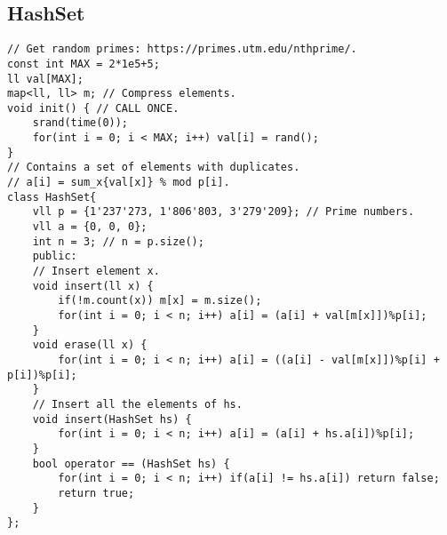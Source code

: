 \documentclass[a4paper]{article}
\begin{document}
\subsection*{HashSet}
\begin{verbatim}
// Get random primes: https://primes.utm.edu/nthprime/.
const int MAX = 2*1e5+5;
ll val[MAX];
map<ll, ll> m; // Compress elements.
void init() { // CALL ONCE.
    srand(time(0));
    for(int i = 0; i < MAX; i++) val[i] = rand();
}
// Contains a set of elements with duplicates.
// a[i] = sum_x{val[x]} % mod p[i].
class HashSet{
    vll p = {1'237'273, 1'806'803, 3'279'209}; // Prime numbers.
    vll a = {0, 0, 0};
    int n = 3; // n = p.size();
    public:
    // Insert element x.
    void insert(ll x) {
        if(!m.count(x)) m[x] = m.size();
        for(int i = 0; i < n; i++) a[i] = (a[i] + val[m[x]])%p[i];
    }
    void erase(ll x) {
        for(int i = 0; i < n; i++) a[i] = ((a[i] - val[m[x]])%p[i] + p[i])%p[i];
    }
    // Insert all the elements of hs.
    void insert(HashSet hs) {
        for(int i = 0; i < n; i++) a[i] = (a[i] + hs.a[i])%p[i];
    }
    bool operator == (HashSet hs) {
        for(int i = 0; i < n; i++) if(a[i] != hs.a[i]) return false;
        return true;
    }
};
\end{verbatim}
\end{document}
